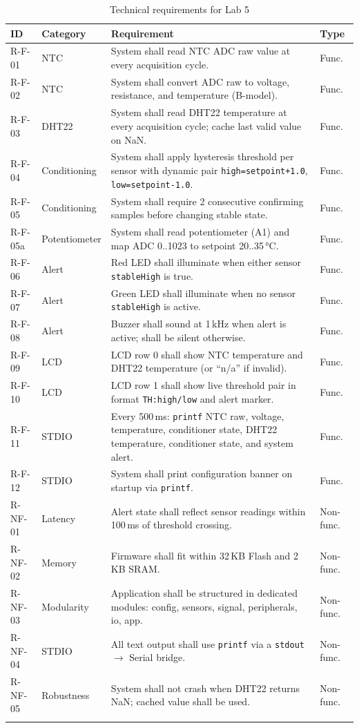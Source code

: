 \documentclass[12pt]{article}
\begin{document}
\begin{longtable}{p{1.5cm} p{2.5cm} p{7.5cm} p{1.5cm}}
\toprule
\textbf{ID} & \textbf{Category} & \textbf{Requirement} & \textbf{Type} \\
\midrule
\endfirsthead
R-F-01 & NTC & System shall read NTC ADC raw value at every acquisition cycle. & Func. \\
R-F-02 & NTC & System shall convert ADC raw to voltage, resistance, and temperature (B-model). & Func. \\
R-F-03 & DHT22 & System shall read DHT22 temperature at every acquisition cycle; cache last valid value on NaN. & Func. \\
R-F-04 & Conditioning & System shall apply hysteresis threshold per sensor with dynamic pair \texttt{high=setpoint+1.0}, \texttt{low=setpoint-1.0}. & Func. \\
R-F-05 & Conditioning & System shall require 2 consecutive confirming samples before changing stable state. & Func. \\
R-F-05a & Potentiometer & System shall read potentiometer (A1) and map ADC 0..1023 to setpoint 20..35\,°C. & Func. \\
R-F-06 & Alert & Red LED shall illuminate when either sensor \texttt{stableHigh} is true. & Func. \\
R-F-07 & Alert & Green LED shall illuminate when no sensor \texttt{stableHigh} is active. & Func. \\
R-F-08 & Alert & Buzzer shall sound at 1\,kHz when alert is active; shall be silent otherwise. & Func. \\
R-F-09 & LCD & LCD row 0 shall show NTC temperature and DHT22 temperature (or ``n/a'' if invalid). & Func. \\
R-F-10 & LCD & LCD row 1 shall show live threshold pair in format \texttt{TH:high/low} and alert marker. & Func. \\
R-F-11 & STDIO & Every 500\,ms: \texttt{printf} NTC raw, voltage, temperature, conditioner state, DHT22 temperature, conditioner state, and system alert. & Func. \\
R-F-12 & STDIO & System shall print configuration banner on startup via \texttt{printf}. & Func. \\
R-NF-01 & Latency & Alert state shall reflect sensor readings within 100\,ms of threshold crossing. & Non-func. \\
R-NF-02 & Memory & Firmware shall fit within 32\,KB Flash and 2\,KB SRAM. & Non-func. \\
R-NF-03 & Modularity & Application shall be structured in dedicated modules: config, sensors, signal, peripherals, io, app. & Non-func. \\
R-NF-04 & STDIO & All text output shall use \texttt{printf} via a \texttt{stdout} $\rightarrow$ Serial bridge. & Non-func. \\
R-NF-05 & Robustness & System shall not crash when DHT22 returns NaN; cached value shall be used. & Non-func. \\
\bottomrule
\caption{Technical requirements for Lab 5}
\label{tab:requirements}
\end{longtable}
\end{document}
